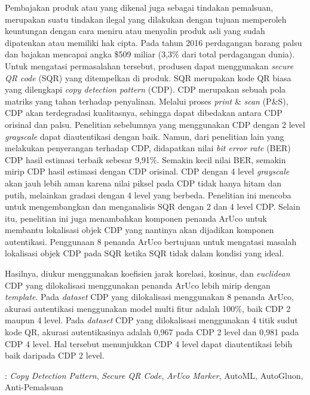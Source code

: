Pembajakan produk atau yang dikenal juga sebagai tindakan pemalsuan, merupakan suatu tindakan ilegal yang dilakukan dengan tujuan memperoleh keuntungan dengan
cara meniru atau menyalin produk asli yang sudah dipatenkan atau memiliki hak cipta. Pada tahun 2016 perdagangan barang palsu dan bajakan mencapai angka \$509
miliar (3,3\% dari total perdagangan dunia). Untuk mengatasi permasalahan tersebut, produsen dapat menggunakan \emph{secure QR code} (SQR) yang ditempelkan di
produk. SQR merupakan kode QR biasa yang dilengkapi \emph{copy detection pattern} (CDP). CDP merupakan sebuah pola matriks yang tahan terhadap penyalinan.
Melalui proses \emph{print} \& \emph{scan} (P\&S), CDP akan terdegradasi kualitasnya, sehingga dapat dibedakan antara CDP orisinal dan palsu. Penelitian
sebelumnya yang menggunakan CDP dengan 2 level \emph{grayscale} dapat diautentikasi dengan baik. Namun, dari penelitian lain yang melakukan penyerangan
terhadap CDP, didapatkan nilai \emph{bit error rate} (BER) CDP hasil estimasi terbaik sebesar 9,91\%. Semakin kecil nilai BER, semakin mirip CDP hasil estimasi
dengan CDP orisinal. CDP dengan 4 level \emph{grayscale} akan jauh lebih aman karena nilai piksel pada CDP tidak hanya hitam dan putih, melainkan gradasi
dengan 4 level yang berbeda. Penelitian ini mencoba untuk mengembangkan dan menganalisis SQR dengan 2 dan 4 level CDP. Selain itu, penelitian ini juga
menambahkan komponen penanda ArUco untuk membantu lokalisasi objek CDP yang nantinya akan dijadikan komponen autentikasi. Penggunaan 8 penanda ArUco bertujuan
untuk mengatasi masalah lokalisasi objek CDP pada SQR ketika SQR tidak dalam kondisi yang ideal.

Hasilnya, diukur menggunakan koefisien jarak korelasi, kosinus, dan \emph{euclidean} CDP yang dilokalisasi menggunakan penanda ArUco lebih mirip dengan \emph{template}. Pada \emph{dataset} CDP yang dilokalisasi menggunakan 8 penanda ArUco, akurasi autentikasi menggunakan model multi fitur adalah 100\%, baik CDP 2
maupun 4 level. Pada \emph{dataset} CDP yang dilokalisasi menggunakan 4 titik sudut kode QR, akurasi autentikasinya adalah 0,967 pada CDP 2 level dan 0,981
pada CDP 4 level. Hal tersebut menunjukkan CDP 4 level dapat diautentikasi lebih baik daripada CDP 2 level.

 : \emph{Copy Detection Pattern}, \emph{Secure QR Code}, \emph{ArUco Marker}, AutoML, AutoGluon, Anti-Pemalsuan
